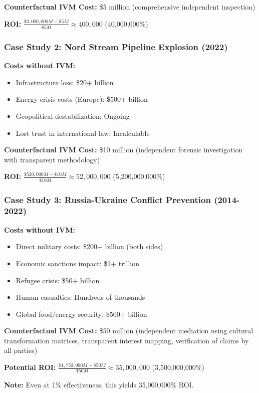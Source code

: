 \documentclass[11pt,a4paper]{article}
\theoremstyle{definition}
\theoremstyle{remark}
\begin{document}
\textbf{Counterfactual IVM Cost:} \$5 million (comprehensive independent inspection)

\textbf{ROI:} $\frac{\$2,000,000M - \$5M}{\$5M} \approx 400,000$ (40,000,000\%)

\subsubsection{Case Study 2: Nord Stream Pipeline Explosion (2022)}

\textbf{Costs without IVM:}
\begin{itemize}
\item Infrastructure loss: \$20+ billion
\item Energy crisis costs (Europe): \$500+ billion
\item Geopolitical destabilization: Ongoing
\item Lost trust in international law: Incalculable
\end{itemize}

\textbf{Counterfactual IVM Cost:} \$10 million (independent forensic investigation with transparent methodology)

\textbf{ROI:} $\frac{\$520,000M - \$10M}{\$10M} \approx 52,000,000$ (5,200,000,000\%)

\subsubsection{Case Study 3: Russia-Ukraine Conflict Prevention (2014-2022)}

\textbf{Costs without IVM:}
\begin{itemize}
\item Direct military costs: \$200+ billion (both sides)
\item Economic sanctions impact: \$1+ trillion
\item Refugee crisis: \$50+ billion
\item Human casualties: Hundreds of thousands
\item Global food/energy security: \$500+ billion
\end{itemize}

\textbf{Counterfactual IVM Cost:} \$50 million (independent mediation using cultural transformation matrices, transparent interest mapping, verification of claims by all parties)

\textbf{Potential ROI:} $\frac{\$1,750,000M - \$50M}{\$50M} \approx 35,000,000$ (3,500,000,000\%)

\textbf{Note:} Even at 1\% effectiveness, this yields 35,000,000\% ROI.
\end{document}
